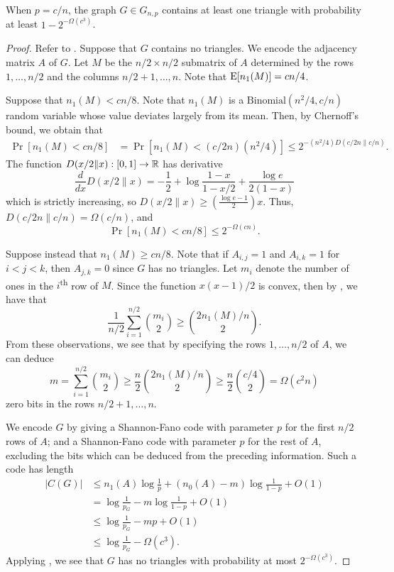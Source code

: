 \begin{thm}
  When $p = c/n$, the graph $G \in G_{n, p}$ contains at least one
  triangle with probability at least $1 - 2^{-\varOmega(c^3)}$.
\end{thm}
\begin{proof}
  Refer to . Suppose that $G$ contains no
  triangles. We encode the adjacency matrix $A$ of $G$. Let $M$ be the
  $n/2 \times n/2$ submatrix of $A$ determined by the rows
  $1, \ldots, n/2$ and the columns $n/2 + 1, \ldots, n$. Note that
  $\operatorname{\mathrm{E}}[n_1(M)] = cn/4$.

  Suppose that $n_1(M) < cn/8$. Note that $n_1(M)$ is a
  $\text{Binomial}(n^2/4, c/n)$ random variable whose value deviates
  largely from its mean. Then, by Chernoff's bound, we obtain that
  \begin{align*}
    \Pr[n_1(M) < cn/8] &= \Pr[n_1(M) < (c/2n) (n^2/4)] \leq 2^{-(n^2/4) D(c/2n \| c/n)}.
  \end{align*}
  The function $D(x/2 \| x) : [0, 1] \to \mathbb{R}$ has
  derivative
  \[\frac{d}{dx} D(x/2 \| x) = - \frac{1}{2} + \log \frac{1 - x}{1 -
    x/2} + \frac{\log e}{2(1 - x)}\]
  which is strictly increasing, so
  $D(x/2 \| x) \geq \left(\frac{\log e - 1}{2}\right)x$. Thus,
  $D(c/2n \| c/n) = \varOmega(c/n)$, and
  \[\Pr[n_1(M) < cn/8] \leq 2^{-\varOmega(cn)}.\]

  Suppose instead that $n_1(M) \geq cn/8$. Note that if $A_{i,j} = 1$
  and $A_{i, k} = 1$ for $i < j < k$, then $A_{j, k} = 0$ since $G$
  has no triangles. Let $m_i$ denote the number of ones in the
  $i$\textsuperscript{th} row of $M$. Since the function $x(x - 1)/2$
  is convex, then by , we have that
  \[
  \frac{1}{n/2} \sum_{i = 1}^{n/2} {m_i \choose 2} \geq \binom{2
    n_1(M)/n}{2}.
  \]
  From these observations, we see that by specifying the rows $1,
  \ldots, n/2$ of $A$, we can deduce
  \[m = \sum_{i = 1}^{n/2} {m_i \choose 2} \geq \frac{n}{2} {2 n_1(M)/n
    \choose 2} \geq \frac{n}{2} {c/4 \choose 2} = \varOmega(c^2 n)\]
  zero bits in the rows $n/2 + 1, \ldots, n$.

  We encode $G$ by giving a Shannon-Fano code with parameter $p$ for
  the first $n/2$ rows of $A$; and a Shannon-Fano code with parameter
  $p$ for the rest of $A$, excluding the bits which can be deduced
  from the preceding information. Such a code has length
  \begin{align*}
    |C(G)| &\leq n_1(A) \log \frac{1}{p} + (n_0(A) - m) \log \frac{1}{1 - p} + O(1) \\
           &= \log \frac{1}{p_G} - m \log \frac{1}{1 - p} + O(1) \\
           &\leq \log \frac{1}{p_G} - mp + O(1) \\
           &\leq \log \frac{1}{p_G} - \varOmega(c^3).
  \end{align*}
  Applying , we see that $G$ has no triangles with
  probability at most $2^{- \varOmega(c^3)}$.
\end{proof}

